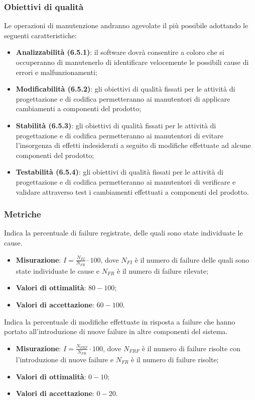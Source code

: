 \subsubsection{Obiettivi di qualità}
Le operazioni di manutenzione andranno agevolate il più possibile adottando le seguenti caratteristiche:
\begin{itemize}
\item \textbf{Analizzabilità (6.5.1)}: il software dovrà consentire a coloro che si occuperanno di manutenerlo di identificare velocemente le possibili cause di errori e malfunzionamenti;
\item \textbf{Modificabilità (6.5.2)}: gli obiettivi di qualità fissati per le attività di progettazione e di codifica permetteranno ai manutentori di applicare cambiamenti a componenti del prodotto;
\item \textbf{Stabilità (6.5.3)}: gli obiettivi di qualità fissati per le attività di progettazione e di codifica permetteranno ai manutentori di evitare l'insorgenza di effetti indesiderati a seguito di modifiche effettuate ad alcune componenti del prodotto;
\item \textbf{Testabilità (6.5.4)}: gli obiettivi di qualità fissati per le attività di progettazione e di codifica permetteranno ai manutentori di verificare e validare attraverso test i cambiamenti effettuati a componenti del prodotto.
\end{itemize}
\subsubsection{Metriche}
\label{capacitaAnalisiFailure}
Indica la percentuale di failure registrate, delle quali sono state individuate le cause.
\begin{itemize}
\item \textbf{Misurazione}: $I=\frac{N_{FI}}{N_{FR}} \cdot 100$, dove $N_{FI}$ è il numero di failure delle quali sono state individuate le cause e $N_{FR}$ è il numero di failure rilevate;
\item \textbf{Valori di ottimalità}: $80 - 100$;
\item \textbf{Valori di accettazione}: $60 - 100$.
\end{itemize}
\label{impattoModifiche}
Indica la percentuale di modifiche effettuate in risposta a failure che hanno portato all'introduzione di nuove failure in altre componenti del sistema.
\begin{itemize}
\item \textbf{Misurazione}: $I=\frac{N_{FRF}}{N_{FR}} \cdot 100$, dove $N_{FRF}$ è il numero di failure risolte con l'introduzione di nuove failure e $N_{FR}$ è il numero di failure risolte;
\item \textbf{Valori di ottimalità}: $0 - 10$;
\item \textbf{Valori di accettazione}: $0 - 20$.
\end{itemize}
